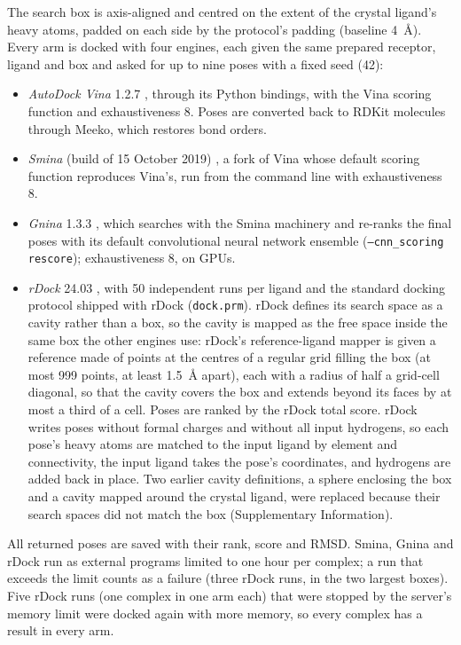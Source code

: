The search box is axis-aligned and centred on the extent of the crystal ligand's heavy
atoms, padded on each side by the protocol's padding (baseline \SI{4}{\angstrom}). Every
arm is docked with four engines, each given the same prepared receptor, ligand and box and
asked for up to nine poses with a fixed seed (42):
\begin{itemize}
  \item \emph{AutoDock Vina} 1.2.7 \citep{trott2010vina,eberhardt2021vina}, through its
    Python bindings, with the Vina scoring function and exhaustiveness 8. Poses are
    converted back to RDKit molecules through Meeko, which restores bond orders.
  \item \emph{Smina} (build of 15 October 2019) \citep{koes2013smina}, a fork of Vina whose
    default scoring function reproduces Vina's, run from the command line with
    exhaustiveness 8.
  \item \emph{Gnina} 1.3.3 \citep{mcnutt2021gnina}, which searches with the Smina machinery and re-ranks the final
    poses with its default convolutional neural network ensemble (\texttt{--cnn\_scoring
    rescore}); exhaustiveness 8, on GPUs.
  \item \emph{rDock} 24.03 \citep{ruizcarmona2014rdock}, with 50 independent runs per ligand
    and the standard docking protocol shipped with rDock (\texttt{dock.prm}). rDock defines its search space as a cavity rather
    than a box, so the cavity is mapped as the free space inside the same box the other
    engines use: rDock's reference-ligand mapper is given a reference made of points at the
    centres of a regular grid filling the box (at most 999 points, at least
    \SI{1.5}{\angstrom} apart), each with a radius of half a grid-cell diagonal, so that the
    cavity covers the box and extends beyond its faces by at most a third of a cell. Poses
    are ranked by the rDock total score. rDock writes poses without formal charges and
    without all input hydrogens, so each pose's heavy atoms are matched to the input ligand
    by element and connectivity, the input ligand takes the pose's coordinates, and
    hydrogens are added back in place. Two earlier cavity definitions, a sphere enclosing
    the box and a cavity mapped around the crystal ligand, were replaced because their
    search spaces did not match the box (Supplementary Information).
\end{itemize}
All returned poses are saved with their rank, score and RMSD. Smina, Gnina and rDock run as
external programs limited to one hour per complex; a run that exceeds the limit counts as a
failure (three rDock runs, in the two largest boxes). Five rDock runs (one complex in
one arm each) that were stopped by the server's memory limit were docked again with more
memory, so every complex has a result in every arm.

